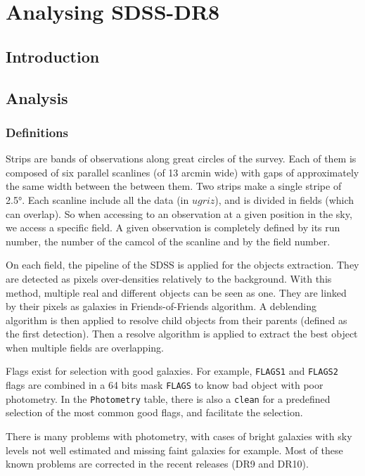 \chapter{Analysing SDSS-DR8\label{ap:sdss}}
%
\section{Introduction}
%
%
\section{Analysis}
%
\subsection{Definitions}
%
Strips are bands of observations along great circles of the survey. Each of
them is composed of six parallel scanlines (of 13 arcmin wide) with gaps of
approximately the same width between the between them. Two strips make a
single stripe of 2.5°. Each scanline include all the data (in $ugriz$), and
is divided in fields (which can overlap). So when accessing to an
observation at a given position in the sky, we access a specific field. A
given observation is completely defined by its run number, the number of the
camcol of the scanline and by the field number.

On each field, the pipeline of the SDSS is applied for the objects
extraction. They are detected as pixels over-densities relatively to the
background. With this method, multiple real and different objects can be
seen as one. They are linked by their pixels as galaxies in
Friends-of-Friends algorithm. A deblending algorithm is then applied to
resolve child objects from their parents (defined as the first detection).
Then a resolve algorithm is applied to extract the best object when multiple
fields are overlapping.

Flags exist for selection with good galaxies. For example, \texttt{FLAGS1}
and \texttt{FLAGS2} flags are combined in a 64 bits mask \texttt{FLAGS} to
know bad object with poor photometry. In the \texttt{Photometry} table,
there is also a \texttt{clean} for a predefined selection of the most common
good flags, and facilitate the selection.

There is many problems with photometry, with cases of bright galaxies with
sky levels not well estimated and missing faint galaxies for example. Most
of these known problems are corrected in the recent releases (DR9 and DR10).

